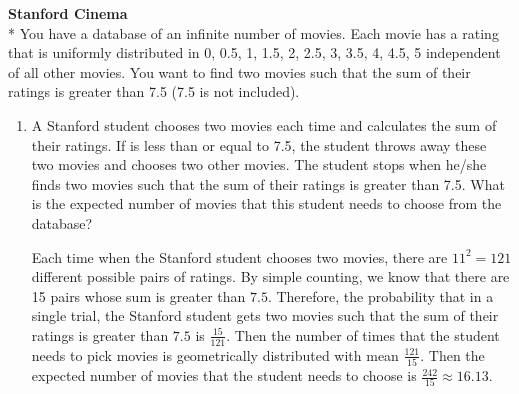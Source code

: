 \question \textbf{Stanford Cinema} \\*
You have a database of an infinite number of movies. Each movie has a 
rating that is uniformly distributed in {0, 0.5, 1, 1.5, 2, 2.5, 3, 
3.5, 4, 4.5, 5} independent of all other movies. You want to find two 
movies such that the sum of their ratings is greater than 7.5 (7.5 is 
not included).
\begin{enumerate}[label=\alph*)]
\item
A Stanford student chooses two movies each time and calculates the sum 
of their ratings. If is less than or equal to 7.5, the student throws 
away these two movies and chooses two other movies. The student stops 
when he/she finds two movies such that the sum of their ratings is 
greater than 7.5. What is the expected number of movies that this 
student needs to choose from the database?

\begin{solution}[4cm]
Each time when the Stanford student chooses two movies, there are $11^2 
= 121$ different possible pairs of ratings. By simple counting, we 
know that there are 15 pairs whose sum is greater than $7.5$. Therefore, 
the probability that in a single trial, the Stanford student gets two 
movies such that the sum of their ratings is greater than $7.5$ is 
$\frac{15}{121}$. Then the number of times that the student needs to 
pick movies is geometrically distributed with mean $\frac{121}{15}$. 
Then the expected number of movies that the student needs to choose 
is $\frac{242}{15} \approx 16.13$.
\end{solution}


\end{enumerate}
